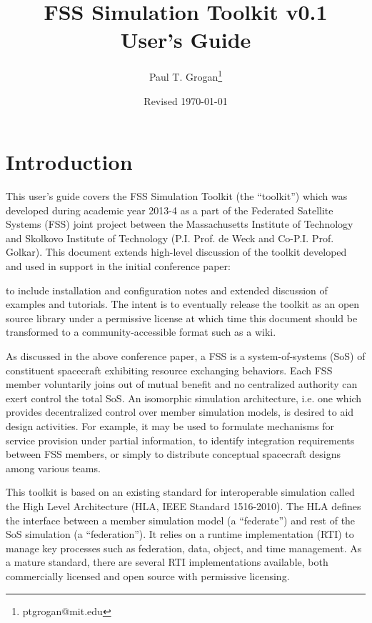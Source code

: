 \documentclass[]{article}
\title{FSS Simulation Toolkit v0.1 \\ User's Guide}
\author{Paul T. Grogan\footnote{ptgrogan@mit.edu}}
\date{Revised \today}
\begin{document}
\maketitle

\section{Introduction}

This user's guide covers the FSS Simulation Toolkit (the ``toolkit'') which was developed during academic year 2013-4 as a part of the Federated Satellite Systems (FSS) joint project between the Massachusetts Institute of Technology and Skolkovo Institute of Technology (P.I. Prof. de Weck and Co-P.I. Prof. Golkar). This document extends high-level discussion of the toolkit developed and used in support in the initial conference paper:
\begin{quote}
\small
{}
\end{quote}
to include installation and configuration notes and extended discussion of examples and tutorials. The intent is to eventually release the toolkit as an open source library under a permissive license at which time this document should be transformed to a community-accessible format such as a wiki.

As discussed in the above conference paper, a FSS is a system-of-systems (SoS) of constituent spacecraft exhibiting resource exchanging behaviors. Each FSS member voluntarily joins out of mutual benefit and no centralized authority can exert control the total SoS. An isomorphic simulation architecture, i.e. one which provides decentralized control over member simulation models, is desired to aid design activities. For example, it may be used to formulate mechanisms for service provision under partial information, to identify integration requirements between FSS members, or simply to distribute conceptual spacecraft designs among various teams.

This toolkit is based on an existing standard for interoperable simulation called the High Level Architecture (HLA, IEEE Standard 1516-2010). The HLA defines the interface between a member simulation model (a ``federate'') and rest of the SoS simulation (a ``federation''). It relies on a runtime implementation (RTI) to manage key processes such as federation, data, object, and time management. As a mature standard, there are several RTI implementations available, both commercially licensed and open source with permissive licensing.
\end{document}

